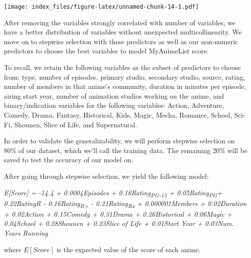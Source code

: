 \documentclass[
]{article}
\begin{document}
\texttt{[image: index\_files/figure-latex/unnamed-chunk-14-1.pdf]}

After removing the variables strongly correlated with number of
variables, we have a better distribution of variables without unexpected
multicollinearity. We move on to stepwise selection with these
predictors as well as our non-numeric predictors to choose the best
variables to model MyAnimeList score.

To recall, we retain the following variables as the subset of predictors
to choose from: type, number of episodes, primary studio, secondary
studio, source, rating, number of members in that anime's community,
duration in minutes per episode, airing start year, number of animation
studios working on the anime, and binary/indication variables for the
following variables: Action, Adventure, Comedy, Drama, Fantasy,
Historical, Kids, Magic, Mecha, Romance, School, Sci-Fi, Shounen, Slice
of Life, and Supernatural.

In order to validate the generalizability, we will perform stepwise
selection on 80\% of our dataset, which we'll call the training data.
The remaining 20\% will be saved to test the accuracy of our model on.

After going through stepwise selection, we yield the following model:

\emph{E{[}Score{]} = -14.4 + 0.0004Episodes +
0.16Rating\textsubscript{PG-13} + 0.05Rating\textsubscript{PG}+
0.22RatingR - 0.16Rating\textsubscript{R+} -
0.21Rating\textsubscript{Rx} + 0.000001Members + 0.02Duration +
0.02Action + 0.15Comedy + 0.31Drama + 0.26Historical + 0.06Magic +
0.04School + 0.28Shounen + 0.23Slice of Life + 0.01Start Year + 0.03Num.
Years Running}

where \(E[Score]\) is the expected value of the score of each anime.
\end{document}
